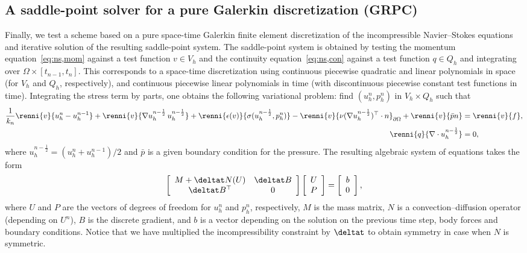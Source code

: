 \subsection{A saddle-point solver for a pure Galerkin discretization (GRPC)}

Finally, we test a scheme based on a pure space-time Galerkin finite
element discretization of the incompressible Navier--Stokes equations
and iterative solution of the resulting saddle-point system. The
saddle-point system is obtained by testing the momentum
equation~\eqref{eq:ns,mom} against a test function $v \in V_h$ and the
continuity equation~\eqref{eq:ns,con} against a test function $q \in
Q_h$ and integrating over $\Omega \times [t_{n-1}, t_n]$. This
corresponds to a space-time discretization using continuous piecewise
quadratic and linear polynomials in space (for $V_h$ and $Q_h$,
respectively), and continuous piecewise linear polynomials in time
(with discontinuous piecewise constant test functions in
time). Integrating the stress term by parts, one obtains the following
variational problem: find $(u^n_h, p^n_h)$ in $V_h \times Q_h$ such
that
\begin{align}
    \frac{1}{k_n} \renni{v}{u^n_h - u^{n-1}_h}
    + \renni{v}{\nabla u^{n-\frac{1}{2}}_h \, u^{n-\frac{1}{2}}_h}
    + \renni{\epsilon(v)}{\sigma(u^{n-\frac{1}{2}}_h, p^n_h)}
    - \renni{v}{\nu (\nabla u^{n-\frac{1}{2}}_h)^{\top} \cdot n}_{\partial \Omega}
    + \renni{v}{\bar{p}n} &= \renni{v}{f}, \\
    \renni{q}{\nabla \cdot u^{n-\frac{1}{2}}_h} &= 0,
\end{align}
where $u^{n-\frac{1}{2}}_h = ({u}^n_h + {u}^{n-1}_h) / 2$ and $\bar{p}$ is a
given boundary condition for the pressure. The resulting algebraic
system of equations takes the form
\begin{equation}
\left[
\begin{array}{cc}
M + \deltat N(U) & \deltat B \\
\deltat B^{\top} & 0
\end{array}
\right]
\left[
\begin{array}{c}
U \\ P
\end{array}
\right]
=
\left[
\begin{array}{c}
b\\ 0
\end{array}
\right],
\label{timestepping}
\end{equation}
where $U$ and $P$ are the vectors of degrees of freedom for $u^n_h$
and $p^n_h$, respectively, $M$ is the mass matrix, $N$ is a
convection--diffusion operator (depending on $U^n$), $B$ is the
discrete gradient, and $b$ is a vector depending on the solution on
the previous time step, body forces and boundary conditions. Notice
that we have multiplied the incompressibility constraint by $\deltat$
to obtain symmetry in case when $N$ is symmetric.

